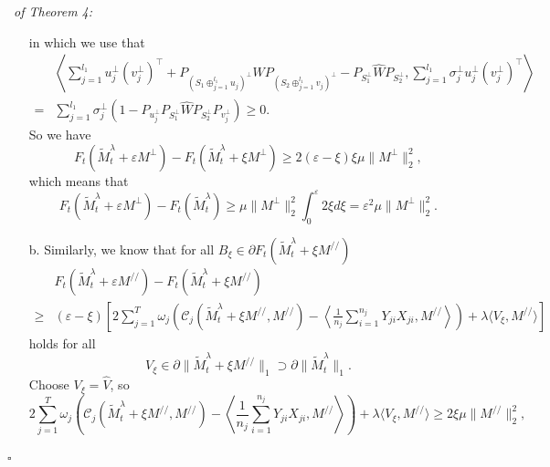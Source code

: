 \documentclass[12pt]{article}
\newenvironment{pf}{{\noindent\it Proof}\ }{\hfill $\square$\par}
\begin{document}
\begin{pf}{\it of Theorem 4:}
\begin{itemize}
\begin{equation*}
  \end{equation*}
  in which we use that
  \begin{equation*}
  \begin{aligned}
  & \left\langle  \sum_{j=1}^{l_1}u^{\perp}_j (v^{\perp}_j)^\top + P_{(S_1\oplus_{j=1}^{l_1} u_j)^{\perp}}W P_{(S_2\oplus_{j=1}^{l_1} v_j)^{\perp}} - P_{S_1^{\perp}} \widehat{W}P_{S_2^{\perp}},\sum_{j=1}^{l_1}\sigma_j^\perp u_j^\perp (v_j^\perp)^\top\right\rangle \\
  =& \sum_{j=1}^{l_1}\sigma_j^\perp \left(1- P_{u_j^\perp}P_{S_1^\perp}\widehat{W}P_{S_2^\perp}P_{v_j^\perp}\right)\ge 0.
  \end{aligned}
  \end{equation*}
  So we have 
  \begin{equation*}
  F_t(\widetilde{M}_t^\lambda +\varepsilon M^{\perp}) - F_t(\widetilde{M}_t^\lambda + \xi M^{\perp})
  \ge 2(\varepsilon-\xi)\xi \mu\|M^\perp\|_2^2,
  \end{equation*}
  which means that
  \begin{equation}
  \label{re_a}
  F_t(\widetilde{M}_t^\lambda +\varepsilon M^{\perp}) - F_t(\widetilde{M}_t^\lambda)
  \ge \mu \|M^\perp\|_2^2\int_{0}^ \varepsilon 2\xi d\xi =\varepsilon^2\mu\|M^\perp\|_2^2.
  \end{equation}
  \item[b.] Similarly, we know that for all $B_\xi \in \partial F_t(\widetilde{M}_t^\lambda +\xi M^{//})$
  \begin{equation*}
  \begin{aligned}
  &F_t(\widetilde{M}_t^\lambda +\varepsilon M^{//})- F_t(\widetilde{M}_t^\lambda +\xi M^{//})  \\\ge &
  (\varepsilon-\xi)\left[2\sum_{j=1}^T \omega_j \left(\mathcal{C}_j( \widetilde{M}_t^\lambda + \xi M^{//}, M^{//}) - \left\langle\frac{1}{n_j}\sum_{i=1}^{n_j}Y_{j i}X_{j i},M^{//}\right\rangle\right) +\lambda \langle V_\xi,M^{//}\rangle \right]
  \end{aligned}
  \end{equation*}
  holds for all
  $$V_\xi \in \partial \|\widetilde{M}_t^\lambda +\xi M^{//}\|_1  \supset \partial \|\widetilde{M}_t^\lambda\|_1 .$$
  Choose $V_\xi=\widehat{V}$, so
  \begin{equation*}
  2\sum_{j=1}^T \omega_j \left(\mathcal{C}_j( \widetilde{M}_t^\lambda + \xi M^{//}, M^{//})- \left\langle\frac{1}{n_j}\sum_{i=1}^{n_j}Y_{j i}X_{j i},M^{//}\right\rangle\right) +\lambda \langle V_\xi,M^{//}\rangle  \ge 2\xi \mu\|M^{//}\|_2^2,
  \end{equation*}

\end{itemize}
\end{pf}
\end{document}
